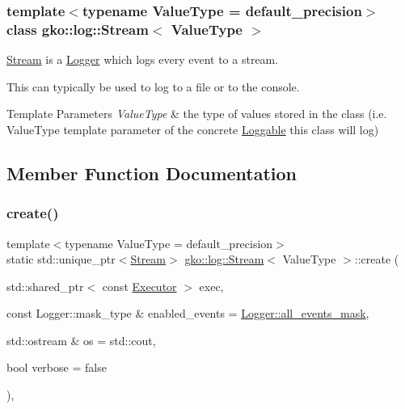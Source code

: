 \subsubsection*{template$<$typename Value\+Type = default\+\_\+precision$>$\newline
class gko\+::log\+::\+Stream$<$ Value\+Type $>$}

\hyperlink{classgko_1_1log_1_1Stream}{Stream} is a \hyperlink{classgko_1_1log_1_1Logger}{Logger} which logs every event to a stream. 

This can typically be used to log to a file or to the console.


\begin{DoxyTemplParams}{Template Parameters}
{\em Value\+Type} & the type of values stored in the class (i.\+e. Value\+Type template parameter of the concrete \hyperlink{classgko_1_1log_1_1Loggable}{Loggable} this class will log) \\
\hline
\end{DoxyTemplParams}


\subsection{Member Function Documentation}
\mbox{\label{classgko_1_1log_1_1Stream_a71f96d3f1cd7c03875476cd8db98145b}} 
\subsubsection{\texorpdfstring{create()}{create()}}
{\footnotesize\ttfamily template$<$typename Value\+Type  = default\+\_\+precision$>$ \\
static std\+::unique\+\_\+ptr$<$\hyperlink{classgko_1_1log_1_1Stream}{Stream}$>$ \hyperlink{classgko_1_1log_1_1Stream}{gko\+::log\+::\+Stream}$<$ Value\+Type $>$\+::create (\begin{DoxyParamCaption}\item[{std\+::shared\+\_\+ptr$<$ const \hyperlink{classgko_1_1Executor}{Executor} $>$}]{exec,  }\item[{const Logger\+::mask\+\_\+type \&}]{enabled\+\_\+events = {\ttfamily \hyperlink{classgko_1_1log_1_1Logger_a02534863a2d2f92dfeb2c39038365532}{Logger\+::all\+\_\+events\+\_\+mask}},  }\item[{std\+::ostream \&}]{os = {\ttfamily std\+:\+:cout},  }\item[{bool}]{verbose = {\ttfamily false} }\end{DoxyParamCaption})\hspace{0.3cm}{\ttfamily [inline]}, {\ttfamily [static]}}



